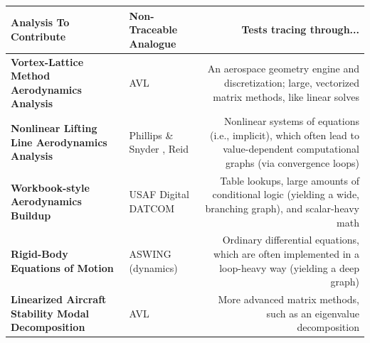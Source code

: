 \documentclass[12pt,vi,oneside,table]{report}
\begin{document}
\begin{table}[H]
\begin{adjustbox}{width=\textwidth}
            \begin{tabularx}{1.2\textwidth}{M E D}
                \toprule
                \textbf{Analysis To Contribute}                            & \textbf{Non-Traceable Analogue}                                               & \textbf{Tests tracing through...}                                                                                                 \\ \toprule
                \textbf{Vortex-Lattice Method Aerodynamics Analysis}       & AVL \cite{avl}                                                                & An aerospace geometry engine and discretization; large, vectorized matrix methods, like linear solves                             \\ \midrule
                \textbf{Nonlinear Lifting Line Aerodynamics Analysis}      & Phillips \& Snyder \cite{phillips_modern_2000}, Reid \cite{reid_general_2020} & Nonlinear systems of equations (i.e., implicit), which often lead to value-dependent computational graphs (via convergence loops) \\ \midrule
                \textbf{Workbook-style Aerodynamics Buildup}               & USAF Digital DATCOM \cite{datcom}                                             & Table lookups, large amounts of conditional logic (yielding a wide, branching graph), and scalar-heavy math                       \\ \midrule
                \textbf{Rigid-Body Equations of Motion}                    & ASWING (dynamics) \cite{aswing}                                               & Ordinary differential equations, which are often implemented in a loop-heavy way (yielding a deep graph)                          \\ \midrule
                \textbf{Linearized Aircraft Stability Modal Decomposition} & AVL \cite{avl}                                                                & More advanced matrix methods, such as an eigenvalue decomposition                                                                 \\
                \bottomrule
            \end{tabularx}

        \end{adjustbox}
    \end{table}
\end{document}
